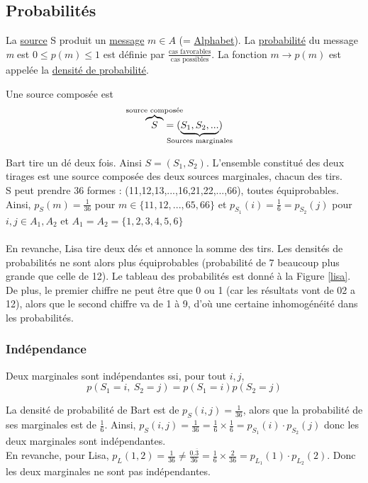 \documentclass[11pt,a4paper]{article}
\renewcommand{\)}{\right)}
\renewcommand{\(}{\left(}
\begin{document}
\subsection{Probabilités}
La \uline{source} S produit un  \uline{message} $m\in A$ (= \uline{Alphabet}). La \uline{probabilité} du message \textit{m} est $0\leq {p(m)} \leq 1$ est définie par $ \frac{\text{cas favorables}}{\text{cas possibles}}$. La fonction $m\to p(m)$ est appelée la \uline{densité de probabilité}. 

Une source composée est 
\begin{equation*}
\overbrace{S}^{\mathclap{\text{source composée}}} =(\underbrace{S_1,S_2,...}_{\mathclap{\text{Sources marginales}}})
\end{equation*}
\begin{exemple}
	Bart tire un dé deux fois. Ainsi $S = (S_1,S_2)$. L'ensemble constitué des deux tirages est une source composée des deux sources marginales, chacun des tirs.\\
	S peut prendre 36 formes : (11,12,13,...,16,21,22,...,66), toutes équiprobables. Ainsi, $p_S(m) = \frac{1}{36}$ pour $m \in \{11,12,...,65,66\}$ et $p_{S_1}(i) = \frac{1}{6} = p_{S_2}(j)$ pour $i,j \in A_1,A_2$ et $A_1 = A_2 = \{1,2,3,4,5,6\}$\\
	\\
	En revanche, Lisa tire deux dés et annonce la somme des tirs. Les densités de probabilités ne sont alors plus équiprobables (probabilité de 7 beaucoup plus grande que celle de 12). Le tableau des probabilités est donné à la Figure \ref{lisa}. De plus, le premier chiffre ne peut être que 0 ou 1 (car les résultats vont de 02 a 12), alors que le second chiffre va de 1 à 9, d'où une certaine inhomogénéité dans les probabilités.
\end{exemple}
\subsubsection{Indépendance}
Deux marginales sont indépendantes ssi, pour tout $i,j$,
\begin{equation*}
	p(S_1 = i,\ S_2 = j) = p(S_1=i)p(S_2=j)
\end{equation*}
\begin{exemple}
	La densité de probabilité de Bart est de $p_S(i,j) = \frac{1}{36}$, alors que la probabilité de ses marginales est de $\frac{1}{6}$. Ainsi, $p_S(i,j) = \frac{1}{36} = \frac{1}{6}\times \frac{1}{6} = p_{S_1}(i)\cdot p_{S_2}(j)$ donc les deux marginales sont indépendantes.\\
	En revanche, pour Lisa, $p_L(1,2) = \frac{1}{36} \neq \frac{0.\overline{3}}{36} = \frac{1}{6}\times \frac{2}{36} = p_{L_1}(1)\cdot p_{L_2}(2)$. Donc les deux marginales ne sont pas indépendantes.
\end{exemple}
\end{document}
